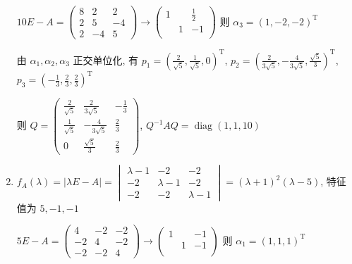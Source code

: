 \begin{enumerate}
                   \( 10E-A = \begin{pmatrix}
                       8 & 2  & 2  \\
                       2 & 5  & -4 \\
                       2 & -4 & 5
                   \end{pmatrix} \rightarrow \begin{pmatrix}
                       1 &   & \frac{1}{2} \\
                         & 1 & -1          \\
                         &   &
                   \end{pmatrix} \) 则 \( \alpha_{3} = (1, -2, -2)^{\mathrm{T}} \)

                   由 \( \alpha_{1}, \alpha_{2}, \alpha_{3} \) 正交单位化, 有 \( p_{1} = \left( \frac{2}{\sqrt{5}}, \frac{1}{\sqrt{5}}, 0 \right)^{\mathrm{T}} \), \( p_{2} = \left( \frac{2}{3\sqrt{5}}, -\frac{4}{3\sqrt{5}}, \frac{\sqrt{5}}{3} \right)^{\mathrm{T}} \), \( p_{3} = \left( -\frac{1}{3}, \frac{2}{3}, \frac{2}{3} \right)^{\mathrm{T}} \)

                   则 \( Q = \begin{pmatrix}
                       \frac{2}{\sqrt{5}} & \frac{2}{3\sqrt{5}}  & -\frac{1}{3} \\
                       \frac{1}{\sqrt{5}} & -\frac{4}{3\sqrt{5}} & \frac{2}{3}  \\
                       0                  & \frac{\sqrt{5}}{3}   & \frac{2}{3}
                   \end{pmatrix} \), \( Q^{-1}AQ = \operatorname{diag}(1, 1, 10) \)
             \item %
                   \( f_{A}(\lambda) = |\lambda E - A| = \begin{vmatrix}
                       \lambda-1 & -2        & -2        \\
                       -2        & \lambda-1 & -2        \\
                       -2        & -2        & \lambda-1
                   \end{vmatrix} = (\lambda+1)^{2}(\lambda-5) \), 特征值为 \( 5, -1, -1 \)

                   \( 5E-A = \begin{pmatrix}
                       4  & -2 & -2 \\
                       -2 & 4  & -2 \\
                       -2 & -2 & 4
                   \end{pmatrix} \rightarrow \begin{pmatrix}
                       1 &   & -1 \\
                         & 1 & -1 \\
                         &   &
                   \end{pmatrix} \) 则 \( \alpha_{1} = (1, 1, 1)^{\mathrm{T}} \)


\end{enumerate}
